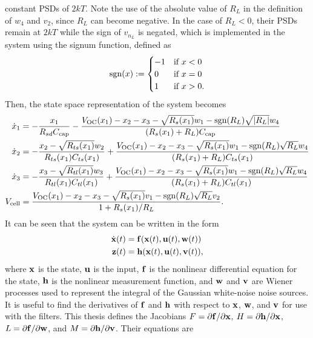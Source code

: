 \documentclass[../zhang_thesis.tex]{subfiles}
\begin{document}
constant PSDs of $2kT$. Note the use of the absolute value of $R_L$ in the definition of $w_4$ and $v_2$, since $R_L$ can become negative. In the case of $R_L<0$, their PSDs remain at $2kT$ while the sign of $v_{n_L}$ is negated, which is implemented in the system using the signum function, defined as
\begin{equation}
    \operatorname{sgn}(x) := \begin{cases}
        -1 & \text{if } x<0 \\
        0 & \text{if } x=0 \\
        1 & \text{if } x>0.
    \end{cases}
\end{equation}
Then, the state space representation of the system becomes
\begin{align}
    \dot{x}_1 &= - \frac{x_1}{R_{sd}C_\text{cap}} - \frac{V_\text{OC}(x_1) - x_2 - x_3 - \sqrt{R_s(x_1)}w_1 - \operatorname{sgn}(R_L)\sqrt{|R_L|}w_4}{(R_s(x_1)+R_L)C_\text{cap}} \\
    \dot{x}_2 &= - \frac{x_2 - \sqrt{R_{ts}(x_1)}w_2}{R_{ts}(x_1)C_{ts}(x_1)} + \frac{V_\text{OC}(x_1) - x_2 - x_3 - \sqrt{R_s(x_1)}w_1 - \operatorname{sgn}(R_L)\sqrt{R_L}w_4}{(R_s(x_1)+R_L)C_{ts}(x_1)} \\
    \dot{x}_3 &= - \frac{x_3 - \sqrt{R_{tl}(x_1)}w_3}{R_{tl}(x_1)C_{tl}(x_1)} + \frac{V_\text{OC}(x_1) - x_2 - x_3 - \sqrt{R_s(x_1)}w_1 - \operatorname{sgn}(R_L)\sqrt{R_L}w_4}{(R_s(x_1)+R_L)C_{tl}(x_1)} \\
    V_\text{cell} &= \frac{V_\text{OC}(x_1) - x_2 - x_3 - \sqrt{R_s(x_1)}v_1 - \operatorname{sgn}(R_L)\sqrt{R_L}v_2}{1+R_s(x_1)/R_L}.
\end{align}
It can be seen that the system can be written in the form
\begin{align}
    \dot{\mathbf{x}}(t) &= \mathbf{f}(\mathbf{x}(t),\mathbf{u}(t),\mathbf{w}(t)) \\
    \mathbf{z}(t) &= \mathbf{h}(\mathbf{x}(t),\mathbf{u}(t),\mathbf{v}(t)),
\end{align}
where $\mathbf{x}$ is the state, $\mathbf{u}$ is the input, $\mathbf{f}$ is the nonlinear differential equation for the state, $\mathbf{h}$ is the nonlinear measurement function, and $\mathbf{w}$ and $\mathbf{v}$ are Wiener processes used to represent the integral of the Gaussian white-noise noise sources. It is useful to find the derivatives of $\mathbf{f}$ and $\mathbf{h}$ with respect to $\mathbf{x}$, $\mathbf{w}$, and $\mathbf{v}$ for use with the filters. This thesis defines the Jacobians $F=\partial\mathbf{f}/\partial\mathbf{x}$, $H=\partial\mathbf{h}/\partial\mathbf{x}$,
$L=\partial\mathbf{f}/\partial\mathbf{w}$, and $M=\partial\mathbf{h}/\partial\mathbf{v}$. Their equations are
\end{document}
